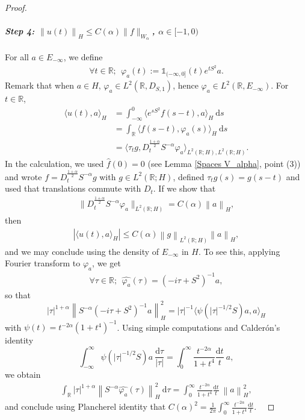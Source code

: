 \documentclass[11pt, letterpaper]{amsart}
\theoremstyle{definition}
\theoremstyle{remark}
\numberwithin{equation}{section}
\begin{document}
\begin{proof}
\paragraph{\textit{Step 4:  $\left\| u(t)\right\|_H \le C(\alpha) \|f\|_{W_\alpha}$, $ \alpha\in [-1,0)$}}
For all $a\in E_{-\infty}$, we define 
\begin{align*}
  \forall t \in \mathbb{R};\ \   \varphi_a(t):= \mathbb{1}_{(-\infty,0]}(t) e^{tS^2}a.
\end{align*}
Remark that when $a\in H$, $\varphi_a\in L^2(\mathbb{R}, D_{S,1})$, hence $\varphi_a \in L^2(\mathbb{R}, E_{-\infty})$.
 For  $t \in \mathbb{R}$,
\begin{align*}
    \langle u(t), a \rangle_H 
    &=  \int_{-\infty}^{0} \langle e ^{sS^2}f(s-t) , a \rangle_H \  \mathrm d s
    \\ 
    &= \int_{\mathbb{R}} \langle f(s-t), \varphi_a (s) \rangle_H \ \mathrm d s 
    \\ 
    &
    = \langle \tau_t g, D_t^{\frac{1+\alpha}{2}}S^{-\alpha}\varphi_a \rangle_{L^2(\mathbb{R};H),L^2(\mathbb{R};H)}. 
\end{align*}
In the calculation, we used $\hat f(0)=0$ (see Lemma \ref{Spaces V_alpha}, point (3)) and wrote $f=D_t^{\frac{1+\alpha}{2}}S^{-\alpha}g$ with $g\in L^2(\mathbb{R}; H)$, defined $\tau_tg(s)=g(s-t)$ and  used that translations commute with $D_t$.  If we show  that 
\begin{align*}\label{Hinfini estimation}
     \| D_t^{\frac{1+\alpha}{2}} S^{-\alpha}\varphi_a  \|_{L^2(\mathbb{R}; H)} = C(\alpha) \left \| a \right \|_H,
\end{align*} then
\begin{align*}
    \left | \langle u(t), a \rangle_H \right |\leq C(\alpha) \left \| g \right \|_{L^2(\mathbb{R}; H)}\left \| a \right \|_H,
\end{align*}
and  we may conclude using the density of $E_{-\infty}$ in $H$. To see this, 
applying Fourier transform to $\varphi_a$, we get 
\begin{align*}
    \forall \tau \in \mathbb{R}; \ \ \hat{\varphi_a}(\tau)= (-i \tau+S^2)^{-1}a, 
\end{align*}
so that
\begin{equation*}
    \left | \tau  \right |^{1+\alpha} \left \| S^{-\alpha}(-{i} \tau+S^2 )^{-1}a \right \|^2_H= |\tau|^{-1} \langle \psi(|\tau|^{-1/2}S) a, a \rangle_H
\end{equation*}
with $\psi(t)= t^{-2\alpha}(1+t^4)^{-1}$.  Using simple computations and Calder\'on's identity $$\int_{-\infty}
^\infty \psi(|\tau|^{-1/2}S)a \ \frac{\mathrm{d}\tau}{|\tau|}=  \int_0^\infty \frac{ t ^{-2\alpha }}{1+t^4} \frac{\mathrm d t}{ t }\  a,$$ we obtain 
\begin{align*}
    \int_{\mathbb{R}} \left | \tau  \right |^{1+\alpha} \left \|S^{-\alpha} \hat{\varphi_a }(\tau) \right \|^2_{H} \ \mathrm{d} \tau =   \int_0^\infty \frac{ t ^{-2\alpha }}{1+t^4} \frac{\mathrm d t}{ t }\ \left \| a \right \|^2_H,
\end{align*}
and conclude using Plancherel identity that $C(\alpha)^2= \frac{1}{2\pi}\int_0^\infty \frac{ t ^{-2\alpha }}{1+t^4} \frac{\mathrm d t}{ t }$.
\


\end{proof}
\end{document}

